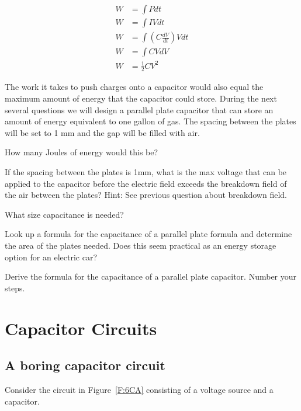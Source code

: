 \begin{align*}
W &= \int{ P dt}\\
W &= \int{ IV dt}\\
W &= \int{ (C\frac{dV}{dt})Vdt}\\
W &=\int{ CVdV}\\
W &= \frac{1}{2}CV^2
\end{align*}

The work it takes to push charges onto a capacitor would also equal the maximum amount of energy that the capacitor could store. During the next several questions we will design a parallel plate capacitor that can store an amount of energy equivalent to one gallon of gas. The spacing between the plates will be set to 1 mm and the gap will be filled with air.

\begin{alevel}
How many Joules of energy would this be?
\end{alevel}

\begin{blevel}
If the spacing between the plates is 1mm, what is the max voltage that can be applied to the capacitor before the electric field exceeds the breakdown field of the air between the plates? Hint: See previous question about breakdown field.
\end{blevel}

\begin{blevel}
What size capacitance is needed?
\end{blevel}

\begin{blevel}
Look up a formula for the capacitance of a parallel plate formula and determine the area of the plates needed. Does this seem practical as an energy storage option for an electric car?
\end{blevel}

\begin{dlevel}
Derive the formula for the capacitance of a parallel plate capacitor. Number your steps.
\end{dlevel}

\section{Capacitor Circuits}
\subsection{A boring capacitor circuit}
Consider the circuit in Figure~\ref{F:6CA} consisting of a voltage source and a capacitor.\par

